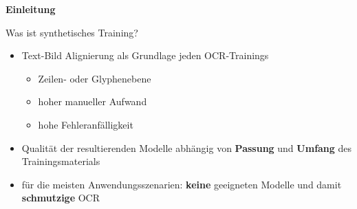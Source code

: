 \documentclass{bbawslides}
\begin{document}
\begin{bbawpart}{\Large\bf Einleitung}
\end{bbawpart}

\begin{bbawslide}{Was ist synthetisches Training?}
  \vspace*{7mm}%
  \centerslidestrue%
  \begin{itemize}
    \item Text-Bild Alignierung als Grundlage jeden OCR-Trainings
    \begin{itemize}
      \item Zeilen- oder Glyphenebene
      \item hoher manueller Aufwand
      \item hohe Fehleranfälligkeit
    \end{itemize}
  \end{itemize}
  \begin{center}
  \end{center}
  \begin{itemize}
    \item Qualität der resultierenden Modelle abhängig von \textbf{Passung} und \textbf{Umfang} des Trainingsmaterials
    \item für die meisten Anwendungsszenarien: \textbf{keine} geeigneten Modelle und damit \textbf{schmutzige} OCR
  \end{itemize}
\end{bbawslide}
\end{document}
